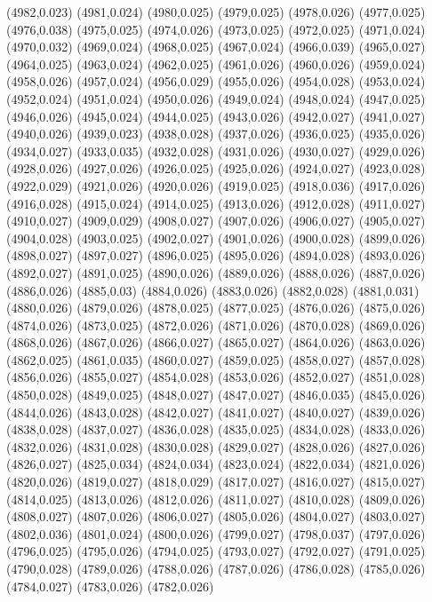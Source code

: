 (4982,0.023)
(4981,0.024)
(4980,0.025)
(4979,0.025)
(4978,0.026)
(4977,0.025)
(4976,0.038)
(4975,0.025)
(4974,0.026)
(4973,0.025)
(4972,0.025)
(4971,0.024)
(4970,0.032)
(4969,0.024)
(4968,0.025)
(4967,0.024)
(4966,0.039)
(4965,0.027)
(4964,0.025)
(4963,0.024)
(4962,0.025)
(4961,0.026)
(4960,0.026)
(4959,0.024)
(4958,0.026)
(4957,0.024)
(4956,0.029)
(4955,0.026)
(4954,0.028)
(4953,0.024)
(4952,0.024)
(4951,0.024)
(4950,0.026)
(4949,0.024)
(4948,0.024)
(4947,0.025)
(4946,0.026)
(4945,0.024)
(4944,0.025)
(4943,0.026)
(4942,0.027)
(4941,0.027)
(4940,0.026)
(4939,0.023)
(4938,0.028)
(4937,0.026)
(4936,0.025)
(4935,0.026)
(4934,0.027)
(4933,0.035)
(4932,0.028)
(4931,0.026)
(4930,0.027)
(4929,0.026)
(4928,0.026)
(4927,0.026)
(4926,0.025)
(4925,0.026)
(4924,0.027)
(4923,0.028)
(4922,0.029)
(4921,0.026)
(4920,0.026)
(4919,0.025)
(4918,0.036)
(4917,0.026)
(4916,0.028)
(4915,0.024)
(4914,0.025)
(4913,0.026)
(4912,0.028)
(4911,0.027)
(4910,0.027)
(4909,0.029)
(4908,0.027)
(4907,0.026)
(4906,0.027)
(4905,0.027)
(4904,0.028)
(4903,0.025)
(4902,0.027)
(4901,0.026)
(4900,0.028)
(4899,0.026)
(4898,0.027)
(4897,0.027)
(4896,0.025)
(4895,0.026)
(4894,0.028)
(4893,0.026)
(4892,0.027)
(4891,0.025)
(4890,0.026)
(4889,0.026)
(4888,0.026)
(4887,0.026)
(4886,0.026)
(4885,0.03)
(4884,0.026)
(4883,0.026)
(4882,0.028)
(4881,0.031)
(4880,0.026)
(4879,0.026)
(4878,0.025)
(4877,0.025)
(4876,0.026)
(4875,0.026)
(4874,0.026)
(4873,0.025)
(4872,0.026)
(4871,0.026)
(4870,0.028)
(4869,0.026)
(4868,0.026)
(4867,0.026)
(4866,0.027)
(4865,0.027)
(4864,0.026)
(4863,0.026)
(4862,0.025)
(4861,0.035)
(4860,0.027)
(4859,0.025)
(4858,0.027)
(4857,0.028)
(4856,0.026)
(4855,0.027)
(4854,0.028)
(4853,0.026)
(4852,0.027)
(4851,0.028)
(4850,0.028)
(4849,0.025)
(4848,0.027)
(4847,0.027)
(4846,0.035)
(4845,0.026)
(4844,0.026)
(4843,0.028)
(4842,0.027)
(4841,0.027)
(4840,0.027)
(4839,0.026)
(4838,0.028)
(4837,0.027)
(4836,0.028)
(4835,0.025)
(4834,0.028)
(4833,0.026)
(4832,0.026)
(4831,0.028)
(4830,0.028)
(4829,0.027)
(4828,0.026)
(4827,0.026)
(4826,0.027)
(4825,0.034)
(4824,0.034)
(4823,0.024)
(4822,0.034)
(4821,0.026)
(4820,0.026)
(4819,0.027)
(4818,0.029)
(4817,0.027)
(4816,0.027)
(4815,0.027)
(4814,0.025)
(4813,0.026)
(4812,0.026)
(4811,0.027)
(4810,0.028)
(4809,0.026)
(4808,0.027)
(4807,0.026)
(4806,0.027)
(4805,0.026)
(4804,0.027)
(4803,0.027)
(4802,0.036)
(4801,0.024)
(4800,0.026)
(4799,0.027)
(4798,0.037)
(4797,0.026)
(4796,0.025)
(4795,0.026)
(4794,0.025)
(4793,0.027)
(4792,0.027)
(4791,0.025)
(4790,0.028)
(4789,0.026)
(4788,0.026)
(4787,0.026)
(4786,0.028)
(4785,0.026)
(4784,0.027)
(4783,0.026)
(4782,0.026)
